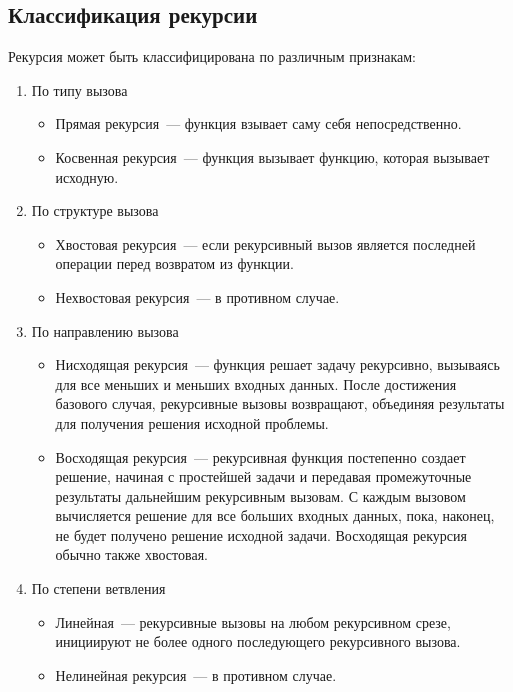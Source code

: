 \subsection{Классификация рекурсии}
Рекурсия может быть классифицирована по различным признакам:
\begin{enumerate}
  \item По типу вызова
        \begin{itemize}
          \item Прямая рекурсия~--- функция взывает саму себя непосредственно.
          \item Косвенная рекурсия~--- функция вызывает функцию, которая вызывает исходную.
        \end{itemize}
  \item По структуре вызова
        \begin{itemize}
          \item Хвостовая рекурсия~--- если рекурсивный вызов является последней операции перед возвратом из функции.
          \item Нехвостовая рекурсия~--- в противном случае.
        \end{itemize}
  \item По направлению вызова
        \begin{itemize}
          \item Нисходящая рекурсия~--- функция решает задачу рекурсивно, вызываясь для все меньших и меньших входных данных. После
                достижения базового случая, рекурсивные вызовы возвращают, объединяя результаты для получения решения исходной проблемы.
          \item Восходящая рекурсия~--- рекурсивная функция постепенно создает решение, начиная с простейшей задачи и
                передавая промежуточные результаты дальнейшим рекурсивным вызовам. С каждым вызовом вычисляется решение для все больших
                входных данных, пока, наконец, не будет получено решение исходной задачи. Восходящая рекурсия обычно также хвостовая.
        \end{itemize}
  \item По степени ветвления
        \begin{itemize}
          \item Линейная~--- рекурсивные вызовы на любом рекурсивном срезе, инициируют не более одного последующего рекурсивного вызова.
          \item Нелинейная рекурсия~--- в противном случае.
        \end{itemize}
\end{enumerate}

